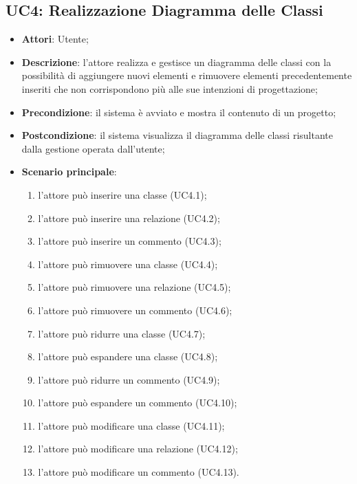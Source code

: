 \subsection{UC4: Realizzazione Diagramma delle Classi}
\label{UC4}
\begin{itemize}
	\item \textbf{Attori}: Utente;
	\item \textbf{Descrizione}: l'attore realizza e gestisce un diagramma delle classi con la possibilità di aggiungere nuovi elementi e rimuovere elementi precedentemente inseriti che non corrispondono più alle sue intenzioni di progettazione;
	\item \textbf{Precondizione}: il sistema è avviato e mostra il contenuto di un progetto;
	\item \textbf{Postcondizione}: il sistema visualizza il diagramma delle classi risultante dalla gestione operata dall'utente;
	\item \textbf{Scenario principale}:
	\begin{enumerate}
		\item l'attore può inserire una classe (UC4.1);
		\item l'attore può inserire una relazione (UC4.2);
		\item l'attore può inserire un commento (UC4.3);
		\item l'attore può rimuovere una classe (UC4.4);
		\item l'attore può rimuovere una relazione (UC4.5);
		\item l'attore può rimuovere un commento (UC4.6);
		\item l'attore può ridurre una classe (UC4.7);
		\item l'attore può espandere una classe (UC4.8);
		\item l'attore può ridurre un commento (UC4.9);
		\item l'attore può espandere un commento (UC4.10);
		\item l'attore può modificare una classe (UC4.11);
		\item l'attore può modificare una relazione (UC4.12);
		\item l'attore può modificare un commento (UC4.13).
	\end{enumerate}
\end{itemize}

